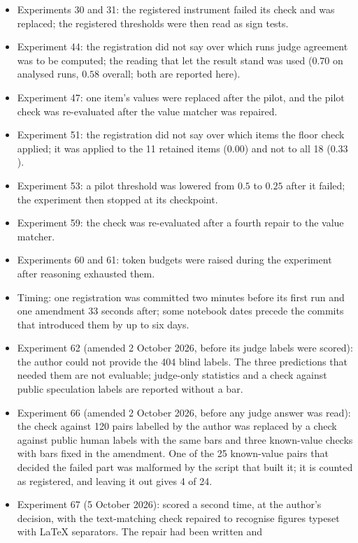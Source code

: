 \documentclass[10pt,twocolumn]{article}
\begin{document}
\begin{itemize}\itemsep0pt
\item Experiments 30 and 31: the registered instrument failed its
check and was replaced; the registered thresholds were then read as
sign tests.
\item Experiment 44: the registration did not say over which runs
judge agreement was to be computed; the reading that let the result
stand was used ($0.70$ on analysed runs, $0.58$ overall; both are
reported here).
\item Experiment 47: one item's values were replaced after the pilot,
and the pilot check was re-evaluated after the value matcher was
repaired.
\item Experiment 51: the registration did not say over which items the
floor check applied; it was applied to the 11 retained items ($0.00$)
and not to all 18 ($0.33$).
\item Experiment 53: a pilot threshold was lowered from $0.5$ to
$0.25$ after it failed; the experiment then stopped at its checkpoint.
\item Experiment 59: the check was re-evaluated after a fourth repair
to the value matcher.
\item Experiments 60 and 61: token budgets were raised during the
experiment after reasoning exhausted them.
\item Timing: one registration was committed two minutes before its
first run and one amendment 33 seconds after; some notebook dates
precede the commits that introduced them by up to six days.
\item Experiment 62 (amended 2 October 2026, before its judge labels
were scored): the author could not provide the 404 blind labels. The
three predictions that needed them are not evaluable; judge-only
statistics and a check against public speculation labels are reported
without a bar.
\item Experiment 66 (amended 2 October 2026, before any judge answer
was read): the check against 120 pairs labelled by the author was
replaced by a check against public human labels with the same bars and
three known-value checks with bars fixed in the amendment. One of the
25 known-value pairs that decided the failed part was malformed by the
script that built it; it is counted as registered, and leaving it out
gives 4 of 24.
\item Experiment 67 (5 October 2026): scored a second time, at the
author's decision, with the text-matching check repaired to recognise
figures typeset with LaTeX separators. The repair had been written and

\end{itemize}
\end{document}
